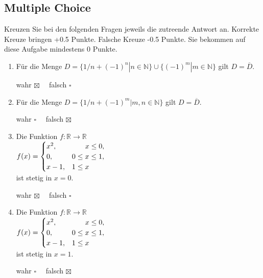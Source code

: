 \documentclass[a4paper]{article}
\begin{document}
\subsection{Multiple Choice}
Kreuzen Sie bei den folgenden Fragen jeweils die zutreende Antwort an. Korrekte Kreuze bringen +0.5 Punkte. Falsche Kreuze -0.5 Punkte. Sie bekommen auf diese Aufgabe mindestens 0 Punkte.\\
\begin{enumerate}[label=({\alph*})]
    \item Für die Menge $D= \{1/n+(-1)^n|n\in \mathbb{N}\}\cup\{(-1)^m|m\in\mathbb{N}\}$ gilt $D= \overline{D}$.
    \begin{flushright}
        wahr $\boxtimes\quad$ falsch $\square$
    \end{flushright}
    \item Für die Menge $D= \{1/n+ (-1)^m|m,n\in\mathbb{N}\}$ gilt $D= \overline{D}$.
    \begin{flushright}
        wahr $\square\quad$ falsch $\boxtimes$
    \end{flushright}
    \item Die Funktion $f: \mathbb{R}\to \mathbb{R}$\\
    \hspace*{4,57cm}\(f(x)=\begin{cases}
        x^2, & \hspace*{0,65cm}x\leq 0,\\
        0, & 0\leq x \leq 1,\\
        x-1, & 1\leq x
    \end{cases}\)\\
    ist stetig in $x=0$.
    \begin{flushright}
        wahr $\boxtimes\quad$ falsch $\square$
    \end{flushright}
    \newpage
    \item Die Funktion $f: \mathbb{R}\to \mathbb{R}$\\
    \hspace*{4,57cm}\(f(x)=\begin{cases}
        x^2, & \hspace*{0,65cm}x\leq 0,\\
        0, & 0\leq x \leq 1,\\
        x-1, & 1\leq x
    \end{cases}\)\\
    ist stetig in $x=1$.
    \begin{flushright}
        wahr $\square\quad$ falsch $\boxtimes$
    \end{flushright}
\end{enumerate}
\end{document}

